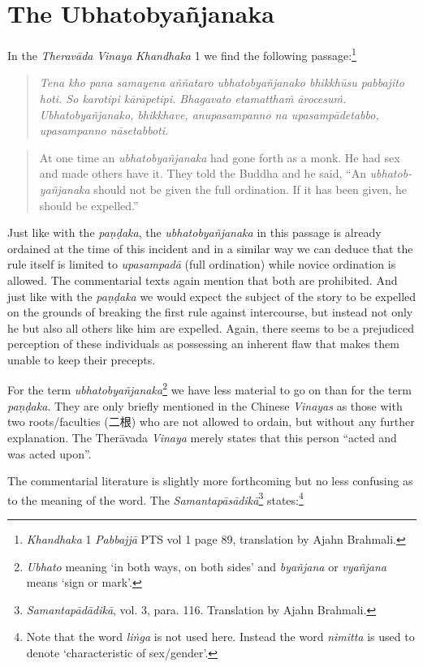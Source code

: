 \section{The Ubhatob­yañ­janaka}
\label{ubhato}
In the \textit{Theravāda} \textit{Vinaya} \textit{Khandhaka} 1 we find the following passage:\footnote{\textit{Khandhaka} 1 \textit{Pabbajjā} PTS vol 1 page 89, translation by Ajahn Brahmali.}

\begin{quote}
\textit{Tena kho pana samayena aññataro ubhatobyañjanako bhikkhūsu pabbajito hoti. So karotipi kārāpetipi. Bhagavato etamatthaṁ ārocesuṁ. Ubhatobyañjanako, bhikkhave, anupasampanno na upasampādetabbo, upasampanno nāsetabboti.}
\end{quote}

\begin{quote}
At one time an \textit{ubhatob­yañ­janaka} had gone forth as a monk. He had sex and made others have it. They told the Buddha and he said, ``An \textit{ubhatob­yañ­janaka} should not be given the full ordination. If it has been given, he should be expelled.''
\end{quote}

Just like with the \textit{paṇḍaka}, the \textit{ubhatob­yañ­janaka} in this passage is already ordained at the time of this incident and in a similar way we can deduce that the rule itself is limited to \textit{upasampadā} (full ordination) while novice ordination is allowed. The commentarial texts again mention that both are prohibited. And just like with the \textit{paṇḍaka} we would expect the subject of the story to be expelled on the grounds of breaking the first rule against intercourse, but instead not only he but also all others like him are expelled. Again, there seems to be a prejudiced perception of these individuals as possessing an inherent flaw that makes them unable to keep their precepts.

For the term \textit{ubhatob­yañ­janaka}\footnote{\textit{Ubhato} meaning `in both ways, on both sides' and \textit{byañjana} or \textit{vyañjana} means `sign or mark'.} we have less material to go on than for the term \textit{paṇḍaka}. They are only briefly mentioned in the Chinese \textit{Vinayas} as those with two roots/faculties (二根) who are not allowed to ordain, but without any further explanation. The Therāvada \textit{Vinaya} merely states that this person ``acted and was acted upon''. 

The commentarial literature is slightly more forthcoming but no less confusing as to the meaning of the word. The \textit{Samantapāsādikā}\footnote{\textit{Samantapādādikā}, vol. 3, para. 116. Translation by Ajahn Brahmali.} states:\footnote{Note that the word \textit{liṅga} is not used here. Instead the word \textit{nimitta} is used to denote `characteristic of sex/gender'.}

